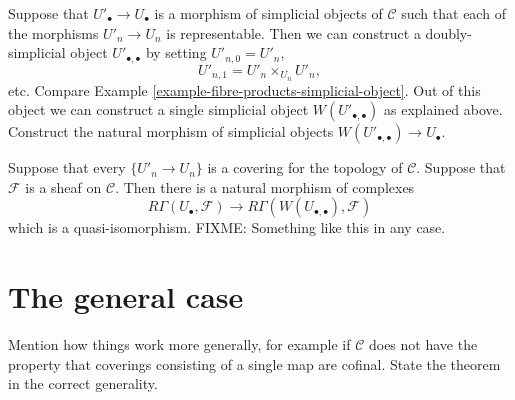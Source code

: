 \noindent
Suppose that $U'_\bullet \to U_\bullet$ is a morphism of simplicial
objects of $\mathcal{C}$ such that each of the morphisms $U'_n \to
U_n$ is representable. Then we can construct a doubly-simplicial
object $U'_{\bullet,\bullet}$ by setting $U'_{n,0}= U'_n$,
$$
U'_{n,1} = U'_n \times_{U_n} U'_n,
$$
etc. Compare Example \ref{example-fibre-products-simplicial-object}. 
Out of this object we can construct a single simplicial object
$W(U'_{\bullet,\bullet})$ as explained above. Construct the 
natural morphism of simplicial objects 
$W(U'_{\bullet,\bullet}) \to U_\bullet$.

\begin{lemma}
Suppose that every $\{U'_n \to U_n\}$ is a covering for the topology
of $\mathcal{C}$. Suppose that $\mathcal{F}$ is a sheaf on 
$\mathcal{C}$. Then there is a natural
morphism of complexes
$$
R\Gamma(U_\bullet, \mathcal{F}) \to 
R\Gamma(W(U_{\bullet,\bullet}), \mathcal{F})
$$
which is a quasi-isomorphism. FIXME: Something like this in any case.
\end{lemma}

\section{The general case}

\noindent
Mention how things work more generally, for example if $\mathcal{C}$
does not have the property that coverings consisting of a single map
are cofinal. State the theorem in the correct generality.







